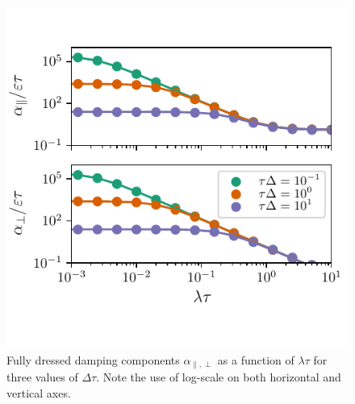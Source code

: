 
\begin{figure}
    \centering
    \includegraphics{gfx/Chapter04/alpha_plot1.pdf}
    \caption{Fully dressed damping components $\alpha_{\parallel,\perp}$ as a function of $\lambda\tau$ for three values of $\Delta\tau$. Note the use of log-scale on both horizontal and vertical axes.}
    \label{fig:alpha3}
\end{figure}

